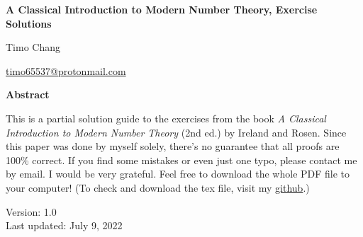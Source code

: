 \documentclass[11pt]{amsbook}
\makeatletter
\theoremstyle{plain}
\theoremstyle{definition}
\theoremstyle{remark}
\newcommand{\myToC}{{
  \renewcommand{\contentsname}{Contents}
  \@starttoc{toc}{\contentsname}
}}
\makeatother
\begin{document}
\begin{titlepage}
\begin{center}
\vspace*{1cm}

\LARGE
\textbf{A Classical Introduction to Modern Number Theory, Exercise Solutions}

\vspace{1.5cm}
\LARGE Timo Chang

\vspace{0.5cm}
\large \url{timo65537@protonmail.com}

\vspace{2cm}
\textbf{Abstract}
\vspace{0.3cm}
\end{center}

This is a partial solution guide to the exercises from the book \textit{A Classical Introduction to Modern Number Theory} (2nd ed.) by Ireland and Rosen. Since this paper was done by myself solely, there's no guarantee that all proofs are 100\% correct. If you find some mistakes or even just one typo, please contact me by email. I would be very grateful. Feel free to download the whole PDF file to your computer! (To check and download the tex file, visit my \href{https://github.com/bettertimo/a-classical-introduction-to-modern-number-theory-solutions}{github}.)

\begin{center}
\vfill

Version: 1.0 \\
Last updated: July 9, 2022
\end{center}

\end{titlepage}

\setcounter{tocdepth}{2}
\myToC










\end{document}
